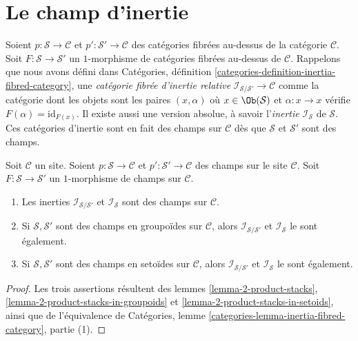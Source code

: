 \section{Le champ d'inertie}
\label{section-the-inertia-stack}

\noindent
Soient
$p : \mathcal{S} \to \mathcal{C}$ et
$p' : \mathcal{S}' \to \mathcal{C}$
des catégories fibrées au-dessus de la catégorie $\mathcal{C}$.
Soit $F : \mathcal{S} \to \mathcal{S}'$ un $1$-morphisme de
catégories fibrées au-dessus de $\mathcal{C}$.
Rappelons que nous avons défini dans
Catégories, définition \ref{categories-definition-inertia-fibred-category},
une {\it catégorie fibrée d'inertie relative}
$\mathcal{I}_{\mathcal{S}/\mathcal{S}'} \to \mathcal{C}$ comme la
catégorie dont les objets sont les paires $(x , \alpha)$ où
$x \in \Ob(\mathcal{S})$ et $\alpha : x \to x$ vérifie
$F(\alpha) = \text{id}_{F(x)}$. Il existe aussi une version absolue,
à savoir l'{\it inertie} $\mathcal{I}_\mathcal{S}$ de $\mathcal{S}$.
Ces catégories d'inertie sont en fait des champs sur $\mathcal{C}$ dès que
$\mathcal{S}$ et $\mathcal{S}'$ sont des champs.

\begin{lemma}
\label{lemma-inertia}
Soit $\mathcal{C}$ un site. Soient
$p : \mathcal{S} \to \mathcal{C}$ et
$p' : \mathcal{S}' \to \mathcal{C}$
des champs sur le site $\mathcal{C}$.
Soit $F : \mathcal{S} \to \mathcal{S}'$ un $1$-morphisme de
champs sur $\mathcal{C}$.
\begin{enumerate}
\item Les inerties $\mathcal{I}_{\mathcal{S}/\mathcal{S}'}$ et
$\mathcal{I}_\mathcal{S}$ sont des champs sur $\mathcal{C}$.
\item Si $\mathcal{S}, \mathcal{S}'$ sont des champs en groupoïdes sur
$\mathcal{C}$, alors $\mathcal{I}_{\mathcal{S}/\mathcal{S}'}$ et
$\mathcal{I}_\mathcal{S}$ le sont également.
\item Si $\mathcal{S}, \mathcal{S}'$ sont des champs en setoïdes sur $\mathcal{C}$,
alors $\mathcal{I}_{\mathcal{S}/\mathcal{S}'}$ et
$\mathcal{I}_\mathcal{S}$ le sont également.
\end{enumerate}
\end{lemma}

\begin{proof}
Les trois assertions résultent des
lemmes \ref{lemma-2-product-stacks},
\ref{lemma-2-product-stacks-in-groupoids} et
\ref{lemma-2-product-stacks-in-setoids},
ainsi que de l'équivalence de
Catégories, lemme \ref{categories-lemma-inertia-fibred-category}, partie (1).
\end{proof}

